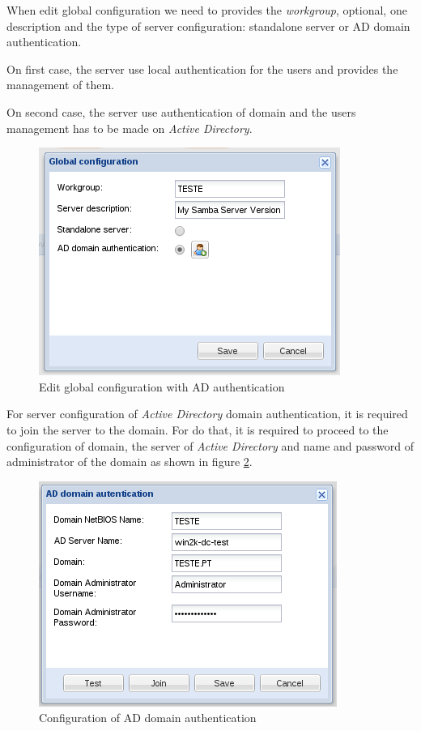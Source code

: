 When edit global configuration we need to provides the \emph{workgroup}, optional, one description and the type of server configuration: standalone server or AD domain authentication.

On first case, the server use local authentication for the users and provides the management of them.

On second case, the server use authentication of domain and the users management has to be made on \emph{Active Directory}.

\begin{figure}[H]
    \begin{center}
    \includegraphics[scale=0.38]{screenshots/etfs/etfs_edit_global_config_ad.png}
    \caption{Edit global configuration with AD authentication}
    \label{fig:etfs_edit_global_config_ad}
    \end{center}
\end{figure}

For server configuration of \emph{Active Directory} domain authentication, it is required to join the server to the domain.
For do that, it is required to proceed to the configuration of domain, the server of \emph{Active Directory} and name and password of administrator of the domain as shown in figure \ref{fig:etfs_join_to_ad}.

\begin{figure}[H]
    \begin{center}
    \includegraphics[scale=0.38]{screenshots/etfs/etfs_join_to_ad.png}
    \caption{Configuration of AD domain authentication}
    \label{fig:etfs_join_to_ad}
    \end{center}
\end{figure}

